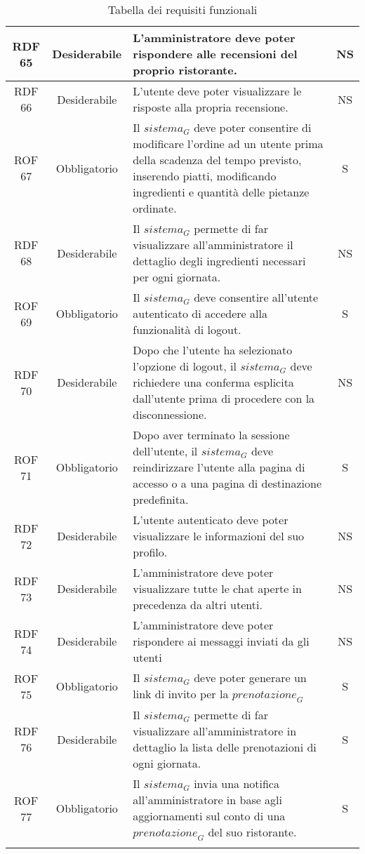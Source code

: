 \begin{longtable}{|c|c|p{12cm}|c|}
\hline
RDF 65 & Desiderabile &L'amministratore deve poter rispondere alle recensioni del proprio ristorante. & NS\\
\hline
RDF 66 & Desiderabile &L'utente deve poter visualizzare le risposte alla propria recensione. & NS\\
\hline
ROF 67 & Obbligatorio &Il $\textit{sistema}_G$ deve poter consentire di modificare l'ordine ad un utente prima della scadenza del tempo previsto, inserendo piatti, modificando ingredienti e quantità delle pietanze ordinate. & S\\
\hline
RDF 68 & Desiderabile &Il $\textit{sistema}_G$ permette di far visualizzare all'amministratore il dettaglio degli ingredienti necessari per ogni giornata. & NS\\
\hline
ROF 69 & Obbligatorio &Il $\textit{sistema}_G$ deve consentire all'utente autenticato di accedere alla funzionalità di logout. & S\\
\hline
RDF 70 & Desiderabile &Dopo che l'utente ha selezionato l'opzione di logout, il $\textit{sistema}_G$ deve richiedere una conferma esplicita dall'utente prima di procedere con la disconnessione. & NS\\ 
\hline
ROF 71 & Obbligatorio & Dopo aver terminato la sessione dell'utente, il $\textit{sistema}_G$ deve reindirizzare l'utente alla pagina di accesso o a una pagina di destinazione predefinita. & S\\
\hline
RDF 72 & Desiderabile & L'utente autenticato deve poter visualizzare le informazioni del suo profilo. & NS\\ 
\hline
RDF 73 & Desiderabile &L'amministratore deve poter visualizzare tutte le chat aperte in precedenza da altri utenti. & NS\\
\hline
RDF 74 & Desiderabile &L'amministratore deve poter rispondere ai messaggi inviati da gli utenti & NS\\
\hline
ROF 75 & Obbligatorio & Il $\textit{sistema}_G$ deve poter generare un link di invito per la $\textit{prenotazione}_G$ & S\\
\hline
RDF 76 & Desiderabile & Il $\textit{sistema}_G$ permette di far visualizzare all’amministratore in dettaglio la lista
delle prenotazioni di ogni giornata. & S\\
 \hline
 ROF 77 & Obbligatorio & Il $\textit{sistema}_G$ invia una notifica all'amministratore in base agli aggiornamenti sul conto di una $\textit{prenotazione}_G$ del suo ristorante. & S\\
 \hline
\caption{Tabella dei requisiti funzionali}
\end{longtable}



